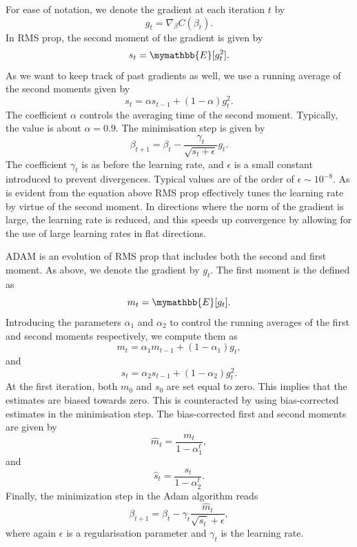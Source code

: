 \documentclass[a4paper,
amsfonts,
amssymb,
amsmath,
reprint,
showkeys,
nofootinbib,
twoside]{revtex4-2}
\begin{document}
For ease of notation, we denote the gradient at each iteration $t$ by
\begin{equation}
    g_t = \nabla_{\beta}C(\beta_t).
\end{equation}
In RMS prop, the second moment of the gradient is given by
\begin{equation}
    s_t = \mymathbb{E}[g_t^2].
\end{equation}
As we want to keep track of past gradients as well, we use a running average of the second moments given by
\begin{equation}
    s_{t} = \alpha s_{t - 1} + (1- \alpha)g_t^2.
\end{equation}
The coefficient $\alpha$ controls the averaging time of the second moment. Typically, the value is about $\alpha = 0.9$. The minimisation step is given by
\begin{equation}
    \beta_{t+1} = \beta_t -  \frac{\gamma_t}{\sqrt{s_t + \epsilon}} g_t.
\end{equation}
The coefficient $\gamma_t$ is as before the learning rate, and $\epsilon$ is a small constant introduced to prevent divergences. Typical values are of the order of $\epsilon \sim 10^{-8}$. As is evident from the equation above RMS prop effectively tunes the learning rate by virtue of the second moment. In directions where the norm of the gradient is large, the learning rate is reduced, and this speeds up convergence by allowing for the use of large learning rates in flat directions.

ADAM is an evolution of RMS prop that includes both the second and first moment. As above, we denote the gradient by $g_t$. The first moment is the defined as
\begin{equation}
    m_t =\mymathbb{E}[g_t].
\end{equation}
Introducing the parameters $\alpha_1$ and $\alpha_2$ to control the running averages of the first and second moments respectively, we compute them as
\begin{equation}
    m_{t} = \alpha_1 m_{t - 1} + (1- \alpha_1)g_t,
\end{equation}
and
\begin{equation}
    s_{t} = \alpha_2 s_{t - 1} + (1- \alpha_2)g_t^2.
\end{equation}
At the first iteration, both $m_0$ and $s_0$ are set equal to zero. This implies that the estimates are biased towards zero. This is counteracted by using bias-corrected estimates in the minimisation step. The bias-corrected first and second moments are given by
\begin{equation}
    \hat{m}_t = \frac{m_t}{1 - \alpha_1^t},
\end{equation}
and
\begin{equation}
    \hat{s}_t = \frac{s_t}{1 - \alpha_2^t}.
\end{equation}
Finally, the minimization step in the Adam algorithm reads
\begin{equation}
    \beta_{t+1} =  \beta_t - \gamma_t \frac{\hat{m}_t}{\sqrt{\hat{s}_t} + \epsilon},
\end{equation}
where again $\epsilon$ is a regularisation parameter and $\gamma_t$ is the learning rate.
\end{document}
